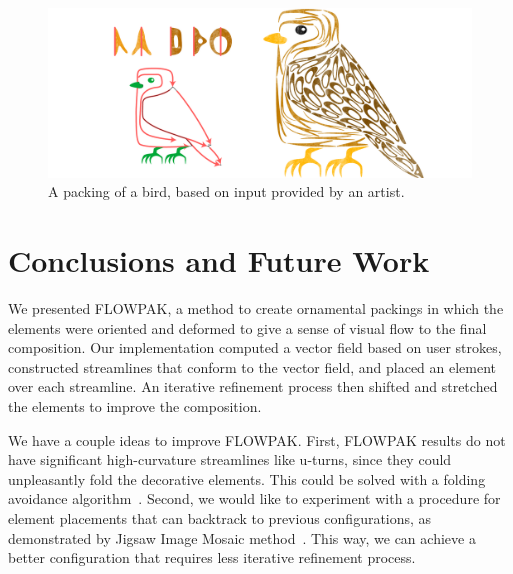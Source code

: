 \begin{figure}
\centering
\includegraphics[width=1.0\textwidth]{figures/flowpak/bird_square.pdf}
\caption[A packing of a bird]
{A packing of a bird, based on input provided by
  an artist.}
\label{bird_square}
\end{figure}


\section{Conclusions and Future Work}
\label{flowpak_conclusions}

\newtext
{
We presented FLOWPAK, a method to create ornamental packings
in which the elements were oriented and deformed to give a sense of visual flow to the final composition.
Our implementation computed a vector field based on user strokes,
constructed streamlines that conform to the vector field, and placed an
element over each streamline. An iterative refinement process then
shifted and stretched the elements to improve the composition.
}

\nnewtext
{
We have a couple ideas to improve FLOWPAK.
First, FLOWPAK results do not have significant high-curvature streamlines like u-turns, 
since they could unpleasantly fold the decorative elements. This could be solved with a folding avoidance algorithm~\cite{Asente2010}.
Second, we would like to experiment with a procedure for element placements that can backtrack to previous configurations, 
as demonstrated by Jigsaw Image Mosaic method~\cite{Kim2002}. 
This way, we can achieve a better configuration that requires less iterative refinement process.
}